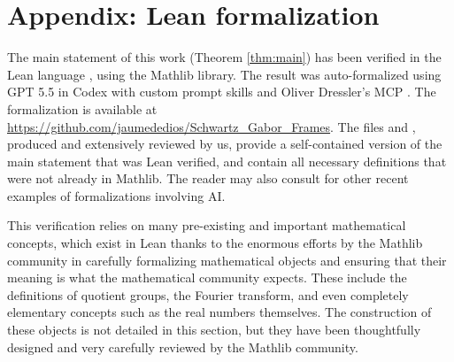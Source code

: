 \documentclass[reqno,a4paper,12pt]{amsart}
\numberwithin{equation}{section}
\newcommand\1{\mathds{1}}
\begin{document}
\section{Appendix: Lean formalization}

The main statement of this work (Theorem \ref{thm:main}) has been verified in the Lean language \cite{lean4}, using the Mathlib library. The result was auto-formalized using GPT 5.5 in Codex with custom prompt skills and Oliver Dressler's MCP \cite{DresslerMCP}. The formalization is available at \url{https://github.com/jaumededios/Schwartz_Gabor_Frames}. The files   and , produced and extensively reviewed by us, provide a self-contained version of the main statement that was Lean verified, and contain all necessary definitions that were not already in Mathlib.  The reader may also consult  \cite{armstrong2026formalization,bertolini20262, hariharan2026milestone,ilin2026semi} for other recent examples of formalizations involving AI. 

This verification relies on many pre-existing and important mathematical concepts, which exist in Lean thanks to the enormous efforts by the Mathlib community \cite{mathlib2020} in carefully formalizing mathematical objects and ensuring that their meaning is what the mathematical community expects.  These include the definitions of quotient groups, the Fourier transform, and even completely elementary concepts such as the real numbers themselves. The construction of these objects is not detailed in this section, but they have been thoughtfully designed and very carefully reviewed by the Mathlib community. 
\end{document}
